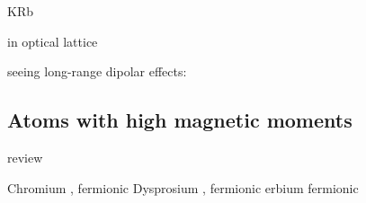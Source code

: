 KRb \cite{Ni2008b,Ospelkaus2010}

in optical lattice \cite{Chotia2012}

seeing long-range dipolar effects:
\cite{Yan2013}


\subsection{Atoms with high magnetic moments}
review \cite{Lahaye2009}

Chromium \cite{Griesmaier2005a,Beaufils2008}, fermionic \cite{Naylor2015}
Dysprosium \cite{Lu2011}, fermionic \cite{Lu2012}
erbium \cite{Aikawa2012} fermionic \cite{Aikawa2014}



